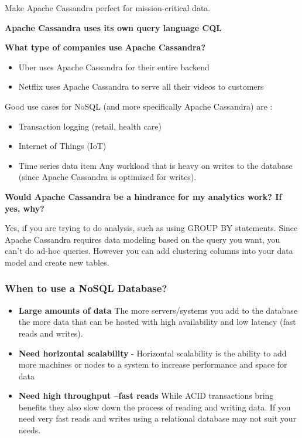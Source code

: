 \documentclass[
	paper=a4,%
	pagesize,%
	8pt, fleqn,%
	headings=small,%
	notitlepage,%
	parskip=never]%
	{scrreprt}
\begin{document}
\begin{multicols*}{3}
\begin{itemize}
Make Apache Cassandra perfect for mission-critical data.

\textbf{Apache Cassandra uses its own query language CQL}
\end{itemize}

\textbf{What type of companies use Apache Cassandra?}

\begin{itemize}
\item Uber uses Apache Cassandra for their entire backend
\item Netflix uses Apache Cassandra to serve all their videos to customers
\end{itemize} 

Good use cases for NoSQL (and more specifically Apache Cassandra) are :

\begin{itemize}
\item Transaction logging (retail, health care)
\item Internet of Things (IoT)
\item Time series data
item Any workload that is heavy on writes to the database (since Apache Cassandra is optimized for writes).
\end{itemize}

\textbf{Would Apache Cassandra be a hindrance for my analytics work? If yes, why?}

Yes, if you are trying to do analysis, such as using GROUP BY statements. Since Apache Cassandra requires data modeling based on the query you want, you can't do ad-hoc queries. However you can add clustering columns into your data model and create new tables.

\subsubsection{When to use a NoSQL Database?}
\begin{itemize}

\item \textbf{Large amounts of data} The more servers/systems you add to the database the more data that can be hosted with high availability and low latency (fast reads and writes).

\item \textbf{Need horizontal scalability} -  Horizontal scalability is the ability to add more machines or nodes to a system to increase performance and space for data

\item \textbf{Need high throughput --fast reads} While ACID transactions bring benefits they also slow down the process of reading and writing data. If you need very fast reads and writes using a relational database may not suit your needs.


\end{itemize}
\end{multicols*}
\end{document}
